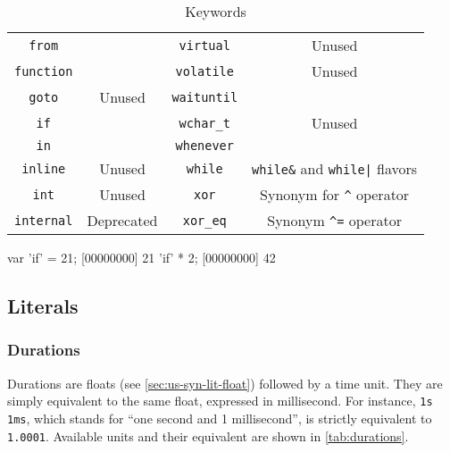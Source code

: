 \begin{table}[\floatpos]
\begin{tabular}{|c|c||c|c|}
    \lstinline"from"              &                                         &
    \lstinline"virtual"           & Unused                                  \\
    \lstinline"function"          &                                         &
    \lstinline"volatile"          & Unused                                  \\
    \lstinline"goto"              & Unused                                  &
    \lstinline"waituntil"         &                                         \\
    \lstinline"if"                &                                         &
    \lstinline"wchar_t"           & Unused                                  \\
    \lstinline"in"                &                                         &
    \lstinline"whenever"          &                                         \\
    \lstinline"inline"            & Unused                                  &
    \lstinline"while"             & \lstinline|while&| and
                                    \lstinline-while|- flavors              \\
    \lstinline"int"               & Unused                                  &
    \lstinline"xor"               & Synonym for \lstinline|^| operator      \\
    \lstinline"internal"          & Deprecated                              &
    \lstinline"xor_eq"            & Synonym \lstinline|^=| operator         \\
    \hline
  \end{tabular}
  \caption{Keywords}
  \label{tab:keywords}
\end{table}
\renewcommand{\baselinestretch}{1}

\begin{urbiscript}[caption=Escaping keywords,label=lst:escape-keyword,float=\floatpos]
var 'if' = 21;
[00000000] 21
'if' * 2;
[00000000] 42
\end{urbiscript}

\subsection{Literals}
\subsubsection{Durations}

Durations are floats (see \autoref{sec:us-syn-lit-float}) followed by a
time unit. They are simply equivalent to the same float, expressed in
millisecond. For instance, \lstinline|1s 1ms|, which stands for ``one
second and 1 millisecond'', is strictly equivalent to
\lstinline|1.0001|. Available units
and their equivalent are shown in \autoref{tab:durations}.

